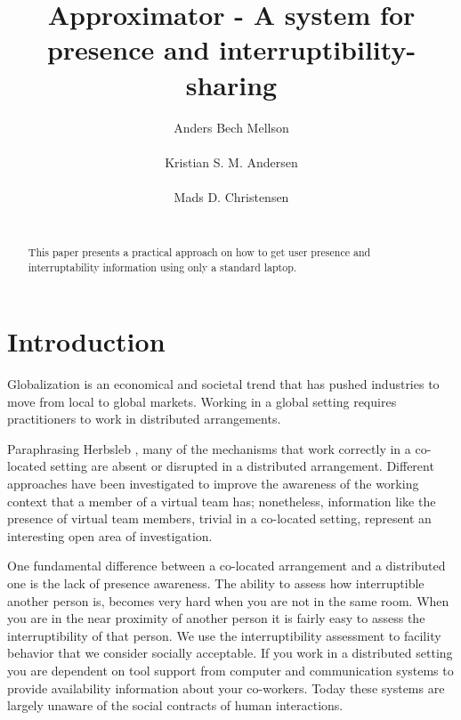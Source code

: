 \documentclass{sigchi}
\begin{document}
\title{Approximator - A system for presence and interruptibility-sharing}
\author{
  \alignauthor Anders Bech Mellson\\
    \\
  \alignauthor Kristian S. M. Andersen\\
    \\
  \alignauthor Mads D. Christensen\\
    \\
}

\maketitle

\begin{abstract}
This paper presents a practical approach on how to get user presence and interruptability information using only a standard laptop.
\end{abstract}



\section{Introduction}
Globalization is an economical and societal trend that has pushed industries to move from local to global markets.
Working in a global setting requires practitioners to work in distributed arrangements.

Paraphrasing Herbsleb \cite{herbsleb2007}, many of the mechanisms that work correctly in a co-located setting are absent or disrupted in a distributed arrangement.
Different approaches \cite{bly1993media} \cite{fogarty2004myvine} \cite{hincapie2011design} \cite{lai2003myteam} \cite{want1992active} have been investigated to improve the awareness of the working context that a member of a virtual team has; nonetheless, information like the presence of virtual team members, trivial in a co-located setting, represent an interesting open area of investigation.

One fundamental difference between a co-located arrangement and a distributed one is the lack of presence awareness.
The ability to assess how interruptible another person is, becomes very hard when you are not in the same room.
When you are in the near proximity of another person it is fairly easy to assess the interruptibility of that person.
We use the interruptibility assessment to facility behavior that we consider socially acceptable.
If you work in a distributed setting you are dependent on tool support from computer and communication systems to provide availability information about your co-workers.
Today these systems are largely unaware of the social contracts of human interactions.
\end{document}
